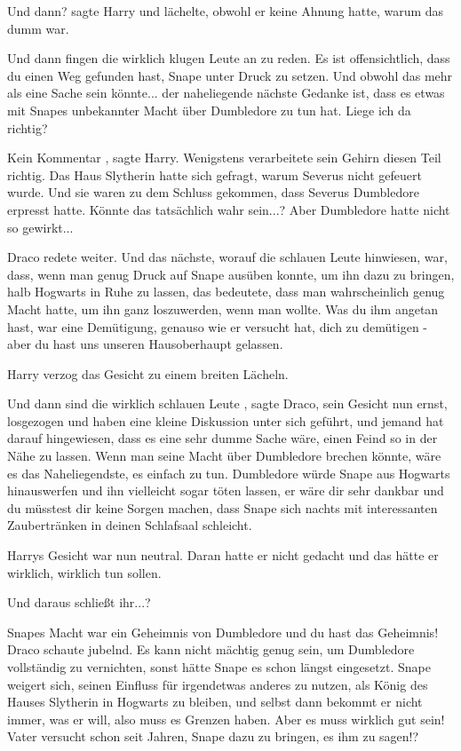 \glqq Und dann?\grqq{} sagte Harry und lächelte, obwohl er keine Ahnung hatte,
warum das dumm war.

\glqq Und dann fingen die wirklich klugen Leute an zu reden. Es ist
offensichtlich, dass du einen Weg gefunden hast, Snape unter Druck zu setzen.
Und obwohl das mehr als eine Sache sein könnte... der naheliegende nächste
Gedanke ist, dass es etwas mit Snapes unbekannter Macht über Dumbledore zu tun
hat. Liege ich da richtig?\grqq{}

\glqq Kein Kommentar\grqq{} , sagte Harry. Wenigstens verarbeitete sein Gehirn
diesen Teil richtig. Das Haus Slytherin hatte sich gefragt, warum Severus nicht
gefeuert wurde. Und sie waren zu dem Schluss gekommen, dass Severus Dumbledore
erpresst hatte. Könnte das tatsächlich wahr sein...? Aber Dumbledore hatte nicht
so gewirkt...

Draco redete weiter. \glqq Und das nächste, worauf die schlauen Leute hinwiesen,
war, dass, wenn man genug Druck auf Snape ausüben konnte, um ihn dazu zu
bringen, halb Hogwarts in Ruhe zu lassen, das bedeutete, dass man wahrscheinlich
genug Macht hatte, um ihn ganz loszuwerden, wenn man wollte. Was du ihm angetan
hast, war eine Demütigung, genauso wie er versucht hat, dich zu demütigen - aber
du hast uns unseren Hausoberhaupt gelassen.\grqq{}

Harry verzog das Gesicht zu einem breiten Lächeln.

\glqq Und dann sind die wirklich schlauen Leute\grqq{} , sagte Draco, sein
Gesicht nun ernst, \glqq losgezogen und haben eine kleine Diskussion unter sich
geführt, und jemand hat darauf hingewiesen, dass es eine sehr dumme Sache wäre,
einen Feind so in der Nähe zu lassen. Wenn man seine Macht über Dumbledore
brechen könnte, wäre es das Naheliegendste, es einfach zu tun. Dumbledore würde
Snape aus Hogwarts hinauswerfen und ihn vielleicht sogar töten lassen, er wäre
dir sehr dankbar und du müsstest dir keine Sorgen machen, dass Snape sich nachts
mit interessanten Zaubertränken in deinen Schlafsaal schleicht.\grqq{}

Harrys Gesicht war nun neutral. Daran hatte er nicht gedacht und das hätte er
wirklich, wirklich tun sollen.

\glqq Und daraus schließt ihr...?\grqq{}

\glqq Snapes Macht war ein Geheimnis von Dumbledore und du hast das
Geheimnis!\grqq{} Draco schaute jubelnd. \glqq Es kann nicht mächtig genug sein,
um Dumbledore vollständig zu vernichten, sonst hätte Snape es schon längst
eingesetzt. Snape weigert sich, seinen Einfluss für irgendetwas anderes zu
nutzen, als König des Hauses Slytherin in Hogwarts zu bleiben, und selbst dann
bekommt er nicht immer, was er will, also muss es Grenzen haben. Aber es muss
wirklich gut sein! Vater versucht schon seit Jahren, Snape dazu zu bringen, es
ihm zu sagen!?\grqq{}

